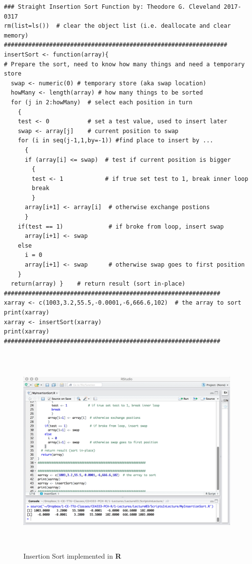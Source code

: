 \begin{lstlisting}[caption=R code demonstrating the insertion sort, label=lst:MyInsertionSort.R]
### Straight Insertion Sort Function by: Theodore G. Cleveland 2017-0317
rm(list=ls())  # clear the object list (i.e. deallocate and clear memory)
################################################################
insertSort <- function(array){
# Prepare the sort, need to know how many things and need a temporary store
  swap <- numeric(0) # temporary store (aka swap location)
  howMany <- length(array) # how many things to be sorted
  for (j in 2:howMany)  # select each position in turn
    {
    test <- 0           # set a test value, used to insert later
    swap <- array[j]    # current position to swap
    for (i in seq(j-1,1,by=-1)) #find place to insert by ...
      {
      if (array[i] <= swap)  # test if current position is bigger
        {
        test <- 1            # if true set test to 1, break inner loop
        break
        }
      array[i+1] <- array[i]  # otherwise exchange postions
      }
    if(test == 1)             # if broke from loop, insert swap
      array[i+1] <- swap      
    else
      i = 0
      array[i+1] <- swap      # otherwise swap goes to first position
    }
  return(array) }    # return result (sort in-place)
##############################################################
xarray <- c(1003,3.2,55.5,-0.0001,-6,666.6,102)  # the array to sort
print(xarray)
xarray <- insertSort(xarray)
print(xarray)
##############################################################
\end{lstlisting}  


\begin{figure}[h!] %
   \centering
   \includegraphics[height=4.2in]{./3-Sorting/MyInsertionSort.jpg} 
   \caption{Insertion Sort implemented in \textbf{R}}
   \label{fig:MyInsertionSort.jpg}
\end{figure}

